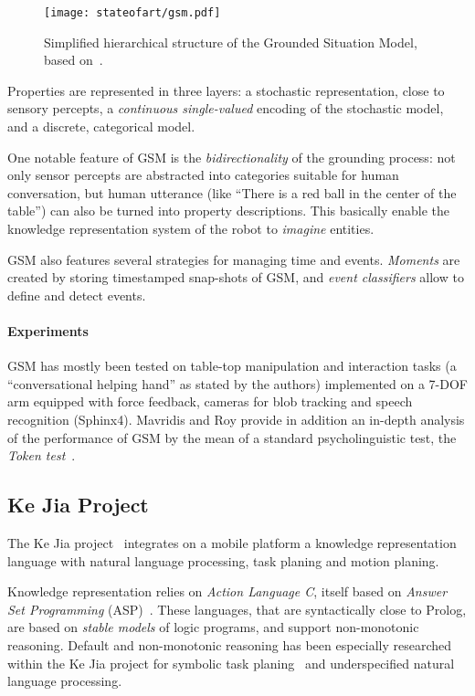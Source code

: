 \begin{figure}
    \centering
    \texttt{[image: stateofart/gsm.pdf]}

    \caption{Simplified hierarchical structure of the Grounded Situation Model,
    based on~\cite{Mavridis2006}.}

    \label{fig|gsm}
\end{figure}

Properties are represented in three layers: a stochastic representation, close
to sensory percepts, a \emph{continuous single-valued} encoding of the
stochastic model, and a discrete, categorical model.

One notable feature of GSM is the \emph{bidirectionality} of the grounding
process: not only sensor percepts are abstracted into categories suitable for
human conversation, but human utterance (like ``There is a red ball in the
center of the table'') can also be turned into property descriptions. This
basically enable the knowledge representation system of the robot to
\emph{imagine} entities.

GSM also features several strategies for managing time and events.
\emph{Moments} are created by storing timestamped snap-shots of GSM, and
\emph{event classifiers} allow to define and detect events.

\paragraph{Experiments} GSM has mostly been tested on table-top manipulation
and interaction tasks (a ``conversational helping hand'' as stated by the
authors) implemented on a 7-DOF arm equipped with force feedback, cameras for blob
tracking and speech recognition (Sphinx4). Mavridis and Roy provide in addition
an in-depth analysis of the performance of GSM by the mean of a standard
psycholinguistic test, the \emph{Token test}~\cite{DiSimoni1978}.

\subsection{Ke Jia Project}
\label{sect|kejia}

The Ke Jia project~\cite{Chen2010} integrates on a mobile platform a knowledge
representation language with natural language processing, task planing and
motion planing.

Knowledge representation relies on \emph{Action Language C}, itself based on
\emph{Answer Set Programming} (ASP)~\cite{Gelfond2008}. These languages, that
are syntactically close to Prolog, are based on \emph{stable models} of logic
programs, and support non-monotonic reasoning. Default and non-monotonic
reasoning has been especially researched within the Ke Jia project for symbolic
task planing~\cite{Ji2011} and underspecified natural language processing.

